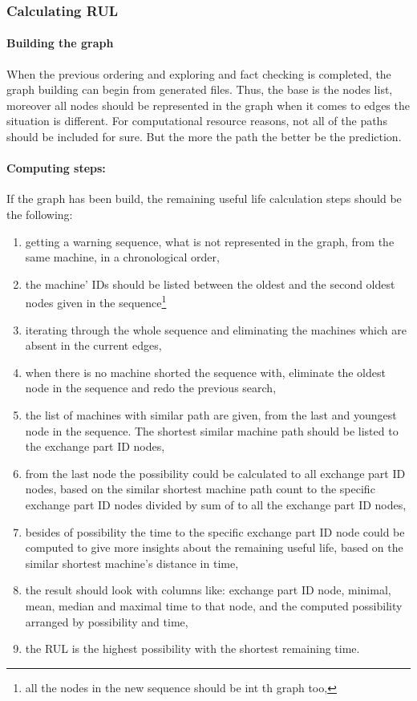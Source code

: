 		\subsubsection{Calculating RUL}
			\paragraph{Building the graph}
			When the previous ordering and exploring and fact checking is completed, the graph building can begin from generated files. Thus, the base is the nodes list, moreover all nodes should be represented in the graph when it comes to edges the situation is different. For computational resource reasons, not all of the paths should be included for sure. But the more the path the better be the prediction.
			\paragraph{Computing steps:}
			If the graph has been build, the remaining useful life calculation steps should be the following:
			\begin{enumerate}
				\item{getting a warning sequence, what is not represented in the graph, from the same machine, in a chronological order,}
				\item{the machine' IDs should be listed between the oldest and the second oldest nodes given in the sequence}\footnote{all the nodes in the new sequence should be int th graph too,} 
				\item{iterating through the whole sequence and eliminating the machines which are absent in the current edges,}
				\item{when there is no machine shorted the sequence with, eliminate the oldest node in the sequence and redo the previous search,}
				\item{the list of machines with similar path are given, from the last and youngest node in the sequence. The shortest similar machine path should be listed to the exchange part ID nodes,}
				\item{from the last node the possibility could be calculated to all exchange part ID nodes, based on the similar shortest machine path count to the specific exchange part ID nodes divided by sum of to all the exchange part ID nodes,}
				\item{besides of possibility the time to the specific exchange part ID node could be computed to give more insights about the remaining useful life, based on the similar shortest machine's distance in time,}
				\item{the result should look with columns like: exchange part ID node, minimal, mean, median and maximal time to that node, and the computed possibility arranged by possibility and time,} 
		 		\item{the RUL is the highest possibility with the shortest remaining time.}
		 	\end{enumerate}
		
